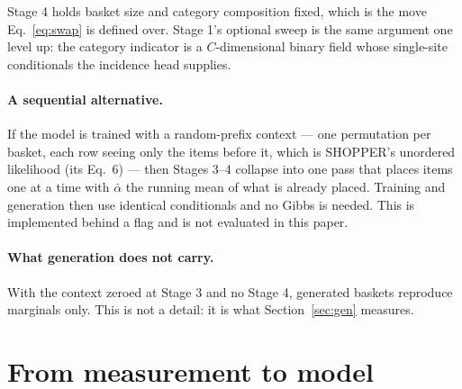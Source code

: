 \documentclass[11pt]{article}
\begin{document}
Stage 4 holds basket size and category composition fixed, which is the move
Eq.~\ref{eq:swap} is defined over. Stage 1's optional sweep is the same argument one
level up: the category indicator is a $C$-dimensional binary field whose single-site
conditionals the incidence head supplies.

\paragraph{A sequential alternative.} If the model is trained with a random-prefix
context --- one permutation per basket, each row seeing only the items before it, which
is SHOPPER's unordered likelihood (its Eq.~6) --- then Stages 3--4 collapse into one
pass that places items one at a time with $\bar\alpha$ the running mean of what is
already placed. Training and generation then use identical conditionals and no Gibbs is
needed. This is implemented behind a flag and is not evaluated in this paper.

\paragraph{What generation does not carry.} With the context zeroed at Stage 3 and no
Stage 4, generated baskets reproduce marginals only. This is not a detail: it is what
Section~\ref{sec:gen} measures.

\section{From measurement to model}
\label{sec:mapping}
\end{document}
